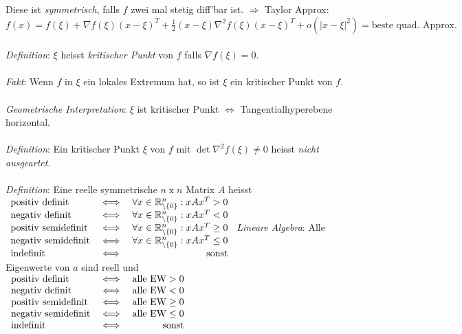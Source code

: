 \documentclass[12pt,a4paper,titlepage]{article}
\newcommand{\setR}{\mathbb{R}}
\begin{document}
Diese ist \emph{symmetrisch}, falls $f$ zwei mal stetig diff'bar ist. $\Rightarrow$ Taylor Approx: \\
$f(x)=f(\xi)+\nabla f(\xi)(x-\xi)^T+\frac{1}{2}(x-\xi)\nabla^2f(\xi)(x-\xi)^T+o(|x-\xi|^2) = \text{beste quad. Approx.}$ \\
\\
\textit{Definition}: $\xi$ heisst \emph{kritischer Punkt} von $f$ falls $\nabla f(\xi)=0$.\\
\\
\textit{Fakt}: Wenn $f$ in $\xi$ ein lokales Extremum hat, so ist $\xi$ ein kritischer Punkt von $f$. \\
\\
\textit{Geometrische Interpretation}: $\xi$ ist kritischer Punkt $\iff$ Tangentialhyperebene horizontal. \\
\\
\textit{Definition}: Ein kritischer Punkt $\xi$ von $f$ mit $\det\nabla^2f(\xi)\neq 0$ heisst \emph{nicht ausgeartet}. \\
\\
\textit{Definition}: Eine reelle symmetrische $n\operatorname{x}n$ Matrix $A$ heisst \\
$\begin{array}{l c r}
  \text{positiv definit} &\iff& \forall x\in\setR^n_{\setminus\{0\}}:xAx^T>0 \\
  \text{negativ definit} &\iff& \forall x\in\setR^n_{\setminus\{0\}}:xAx^T<0 \\
  \text{positiv semidefinit} &\iff& \forall x\in\setR^n_{\setminus\{0\}}:xAx^T\geq 0 \\
  \text{negativ semidefinit} &\iff& \forall x\in\setR^n_{\setminus\{0\}}:xAx^T\leq 0 \\
  \text{indefinit} &\iff& \text{sonst}
\end{array}$
\newpage
\textit{Lineare Algebra}: Alle Eigenwerte von $a$ sind reell und \\
$\begin{array}{l c r}
  \text{positiv definit} &\iff& \text{alle EW}>0 \\
  \text{negativ definit} &\iff& \text{alle EW}<0 \\
  \text{positiv semidefinit} &\iff& \text{alle EW}\geq0 \\
  \text{negativ semidefinit} &\iff& \text{alle EW}\leq0 \\
  \text{indefinit} &\iff& \text{sonst}
\end{array}$ \\
\\
\end{document}
